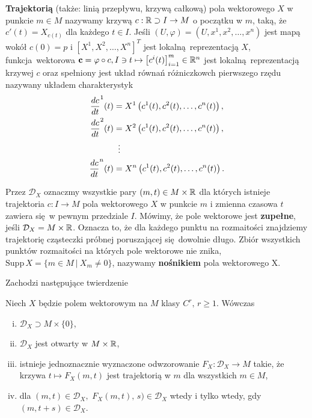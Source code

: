 \textbf{Trajektorią} (także: linią przepływu, krzywą całkową) pola wektorowego \(X\) w punkcie \(m\in M\) nazywamy krzywą \(c: \mathbb{R} \supset I \rightarrow M\) o początku w \(m\), taką, że \(c'(t) = X_{c(t)}\) dla każdego \(t\in I\). Jeśli \((U, \varphi) = (U, x^1, x^2, \dots, x^n)\) jest mapą wokół \(c(0)=p\) i \([X^1, X^2, \dots, X^n]^T\) jest lokalną reprezentacją \(X\), funkcja wektorowa \(\mathbf{c} = \varphi \circ c, I \ni t \mapsto \left[c^i(t)\right]_{i=1}^m \in \mathbb{R}^n\) jest lokalną reprezentacją krzywej \(c\) oraz spełniony jest układ równań różniczkowch pierwszego rzędu nazywany układem charakterystyk
\begin{align*}
    \frac{dc}{dt}^1(t) &= X^1\left(c^1(t), c^2(t), \dots, c^n(t)\right),\\
    \frac{dc}{dt}^2(t) &= X^2\left(c^1(t), c^2(t), \dots, c^n(t)\right),\\
    &\mathrel{\makebox[\widthof{=}]{\vdots}}  \\
    \frac{dc}{dt}^n(t) &= X^n\left(c^1(t), c^2(t), \dots, c^n(t)\right).
\end{align*}

Przez \(\mathcal{D}_X\) oznaczmy wszystkie pary \((m, t)\in M \times \mathbb{R}\) dla których istnieje trajektoria \(c: I\rightarrow M\) pola wektorowego \(X\) w punkcie \(m\) i zmienna czasowa \(t\) zawiera się w pewnym przedziale \(I\). Mówimy, że pole wektorowe jest \textbf{zupełne}, jeśli \(\mathcal{D}_X = M \times \mathbb{R}\). Oznacza to, że dla każdego punktu na rozmaitości znajdziemy trajektorię cząsteczki próbnej poruszającej się dowolnie długo. Zbiór wszystkich punktów rozmaitości na których pole wektorowe nie znika, \(\mathrm{Supp}\,X=\{m\in M\:|\: X_m\neq 0\}\), nazywamy \textbf{nośnikiem} pola wektorowego X. 

Zachodzi następujące twierdzenie

\begin{twierdzenie}\label{tw:D}
Niech \(X\) będzie polem wektorowym na \(M\) klasy \(C^r,\, r\geq1\). Wówczas
\begin{enumerate}[i)]
\item \(\mathcal{D}_X\supset M\times \{0\}\),
\item \(\mathcal{D}_X\) jest otwarty w \(M\times \mathbb{R}\),
\item istnieje jednoznacznie wyznaczone odwzorowanie \(F_X:\mathcal{D}_X\rightarrow M\) takie, że krzywa \(t\mapsto F_X(m,t)\) jest trajektorią w \(m\) dla wszystkich \(m\in M\),
\item dla \((m,t)\in \mathcal{D}_X,\) \(F_X(m,t),\, s)\in\mathcal{D}_X\) wtedy i tylko wtedy, gdy \((m, t+s)\in \mathcal{D}_X\).
\end{enumerate}
\end{twierdzenie}  

